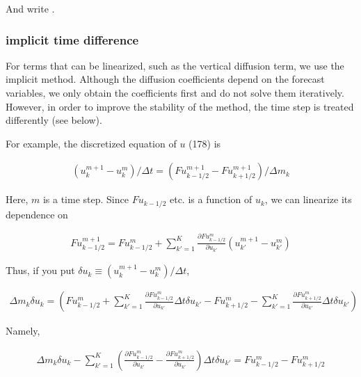 And write .

\hypertarget{implicit-time-difference}{%
\subsubsection{implicit time
difference}\label{implicit-time-difference}}

For terms that can be linearized, such as the vertical diffusion term,
we use the implicit method. Although the diffusion coefficients depend
on the forecast variables, we only obtain the coefficients first and do
not solve them iteratively. However, in order to improve the stability
of the method, the time step is treated differently (see below).

For example, the discretized equation of \(u\) (178) is

\begin{eqnarray}
  (u_k^{m+1} - u_k^{m})/\Delta t
    = (Fu^{m+1}_{k-1/2}-Fu^{m+1}_{k+1/2})/\Delta m_k
\end{eqnarray}

Here, \(m\) is a time step. Since \(Fu_{k-1/2}\) etc. is a function of
\(u_k\), we can linearize its dependence on

\begin{eqnarray}
   Fu^{m+1}_{k-1/2}
  =  Fu^{m}_{k-1/2}
  +  \sum_{k'=1}^{K}
     \frac{\partial{Fu^{m}_{k-1/2}}}{\partial {u_{k'}}} (u^{m+1}_{k'}-u^{m}_{k'})
\end{eqnarray}

Thus, if you put \(\delta u_k \equiv (u^{m+1}_{k}-u^{m}_{k})/\Delta t\),

\begin{eqnarray}
  \Delta m_k \delta u_k
  =   \left( Fu^{m}_{k-1/2}
         +  \sum_{k'=1}^{K}
            \frac{\partial{Fu^{m}_{k-1/2}}}{\partial {u_{k'}}} \Delta t \delta u_{k'}
         -   Fu^{m}_{k+1/2}
         -  \sum_{k'=1}^{K}
            \frac{\partial{Fu^{m}_{k+1/2}}}{\partial {u_{k'}}} \Delta t \delta u_{k'}
      \right)
\end{eqnarray}

Namely,

\begin{eqnarray}
  \Delta m_k \delta u_k
  -  \sum_{k'=1}^{K} \left(  \frac{\partial{Fu^{m}_{k-1/2}}}{\partial {u_{k'}}}
                       - \frac{\partial{Fu^{m}_{k+1/2}}}{\partial {u_{k'}}} \right)
                 \Delta t\delta u_{k'}
  = Fu^{m}_{k-1/2} - Fu^{m}_{k+1/2}
\end{eqnarray}

